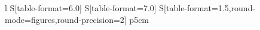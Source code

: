 \begin{tabular}{
    l S[table-format=6.0] S[table-format=7.0] S[table-format=1.5,round-mode=figures,round-precision=2] p{5cm}
  }
\end{tabular}
